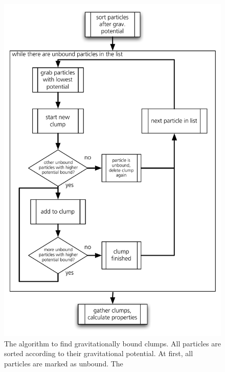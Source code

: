 \begin{figure}[htbp]
\begin{center}
\includegraphics[scale=0.6]{24algo_fof1.pdf}
\caption{The algorithm to find gravitationally bound clumps. All particles are sorted according to their gravitational potential. At first, all particles are marked as unbound. The }
\label{ch02_fig24}
\end{center}
\end{figure}

